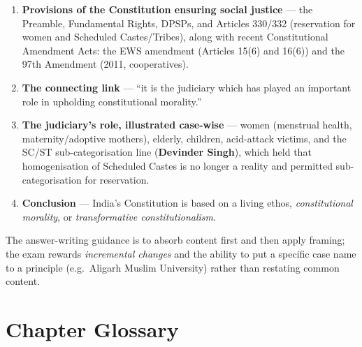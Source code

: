 \begin{enumerate}
  \item \textbf{Provisions of the Constitution ensuring social justice} — the Preamble,
        Fundamental Rights, DPSPs, and Articles 330/332 (reservation for women and
        Scheduled Castes/Tribes), along with recent Constitutional Amendment Acts: the EWS
        amendment (Articles 15(6) and 16(6)) and the 97th Amendment (2011, cooperatives).
  \item \textbf{The connecting link} — ``it is the judiciary which has played an important
        role in upholding constitutional morality.''
  \item \textbf{The judiciary's role, illustrated case-wise} — women (menstrual health,
        maternity/adoptive mothers), elderly, children, acid-attack victims, and the SC/ST
        sub-categorisation line (\textbf{Devinder Singh}), which held that homogenisation
        of Scheduled Castes is no longer a reality and permitted sub-categorisation for
        reservation.
  \item \textbf{Conclusion} — India's Constitution is based on a living ethos,
        \emph{constitutional morality}, or \emph{transformative constitutionalism}.
\end{enumerate}

\begin{CriticalPoint}
The answer-writing guidance is to absorb content first and then apply framing; the exam
rewards \emph{incremental changes} and the ability to put a specific case name to a
principle (e.g.\ Aligarh Muslim University) rather than restating common content.
\end{CriticalPoint}

\section*{Chapter Glossary}

